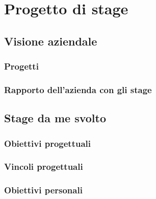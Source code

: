 \chapter{Progetto di stage}
\label{cap:progettoDiStage}

\section{Visione aziendale}
\subsection{Progetti}
%

\subsection{Rapporto dell'azienda con gli stage}
%

\section{Stage da me svolto}
\subsection{Obiettivi progettuali}
%

\subsection{Vincoli progettuali}
%

\subsection{Obiettivi personali}
%

